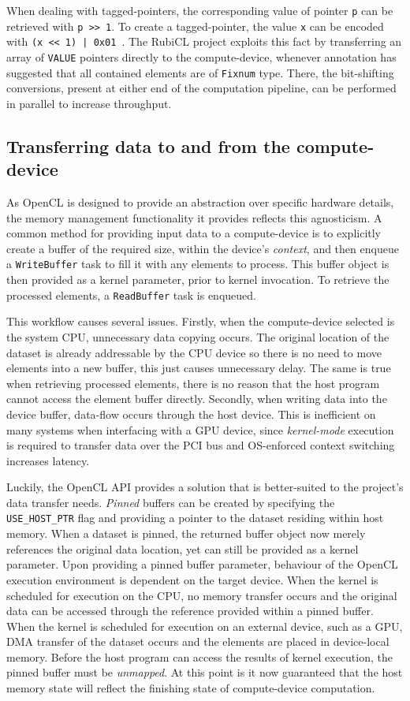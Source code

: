 When dealing with tagged-pointers, the corresponding value of pointer \verb|p| can be retrieved with \verb|p >> 1|. To create a tagged-pointer, the value \verb|x| can be encoded with \verb?(x << 1) | 0x01 ?. The RubiCL project exploits this fact by transferring an array of \verb|VALUE| pointers directly to the compute-device, whenever annotation has suggested that all contained elements are of \verb|Fixnum| type. There, the bit-shifting conversions, present at either end of the computation pipeline, can be performed in parallel to increase throughput.

\subsection{Transferring data to and from the compute-device}
As \ac{OpenCL} is designed to provide an abstraction over specific hardware details, the memory management functionality it provides reflects this agnosticism.
A common method for providing input data to a compute-device is to explicitly create a buffer of the required size, within the device's \emph{context}, and then enqueue a \verb|WriteBuffer| task to fill it with any elements to process. This buffer object is then provided as a kernel parameter, prior to kernel invocation. To retrieve the processed elements, a \verb|ReadBuffer| task is enqueued.

This workflow causes several issues. Firstly, when the compute-device selected is the system \ac{CPU}, unnecessary data copying occurs. The original location of the dataset is already addressable by the \ac{CPU} device so there is no need to move elements into a new buffer, this just causes unnecessary delay. The same is true when retrieving processed elements, there is no reason that the host program cannot access the element buffer directly. Secondly, when writing data into the device buffer, data-flow occurs through the host device. This is inefficient on many systems when interfacing with a \ac{GPU} device, since \emph{kernel-mode} execution is required to transfer data over the \ac{PCI} bus and \ac{OS}-enforced context switching increases latency.

Luckily, the \ac{OpenCL} \ac{API} provides a solution that is better-suited to the project's data transfer needs.
\emph{Pinned} buffers can be created by specifying the \verb|USE_HOST_PTR| flag and providing a pointer to the dataset residing within host memory.
When a dataset is pinned, the returned buffer object now merely references the original data location, yet can still be provided as a kernel parameter.
Upon providing a pinned buffer parameter, behaviour of the \ac{OpenCL} execution environment is dependent on the target device.
When the kernel is scheduled for execution on the \ac{CPU}, no memory transfer occurs and the original data can be accessed through the reference provided within a pinned buffer.
When the kernel is scheduled for execution on an external device, such as a \ac{GPU}, \ac{DMA} transfer of the dataset occurs and the elements are placed in device-local memory.
Before the host program can access the results of kernel execution, the pinned buffer must be \emph{unmapped}. At this point is it now guaranteed that the host memory state will reflect the finishing state of compute-device computation.

